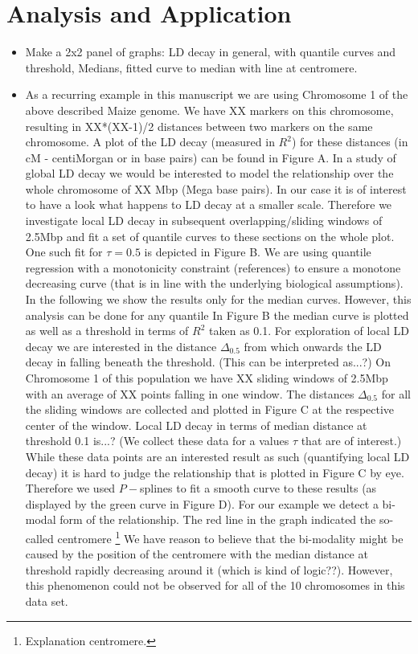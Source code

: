 \documentclass[twoside]{report}
\begin{document}
\section{Analysis and Application}
\begin{itemize}
\item Make a 2x2 panel of graphs: LD decay in general, with quantile curves and threshold, 
	Medians, fitted curve to median with line at centromere.
\item As a recurring example in this manuscript we are using Chromosome 1 of the above described 
	Maize genome. We have XX markers on this chromosome, resulting in XX*(XX-1)/2 distances 
	between two markers on the same chromosome. A plot of the LD decay (measured in $R^2$) 
	for these distances (in cM - centiMorgan or in base pairs) can be found in Figure A. 
	In a study of global 
	LD decay we would be interested to model the relationship over the whole chromosome of 
	XX Mbp (Mega base pairs). In our case it is of interest to have a look what happens to 
	LD decay at a smaller scale. Therefore we investigate local LD decay in subsequent 
	overlapping/sliding windows of 2.5Mbp and fit a set of quantile curves to these 
	sections on the whole plot. One such fit for $\tau = 0.5$ is depicted in Figure B. 
	We are using quantile 
	regression with a monotonicity constraint (references) 
	to ensure a monotone decreasing curve (that is 
	in line with the underlying biological assumptions). In the following we show the 
	results only for the median curves. However, this analysis can be done for any quantile  
	In Figure B the median curve is plotted as well as a threshold in terms of $R^2$ taken as 
	0.1. For exploration of local LD decay we are interested in the distance $\Delta_{0.5}$ from 
	which onwards the LD decay in falling beneath the threshold. (This can be interpreted as...?)
	On Chromosome 1 of this population we have XX sliding windows of 2.5Mbp with an 
	average of XX points falling in one window. The distances 
	$\Delta_{0.5}$ for all the sliding windows are collected and plotted in Figure C 
	at the respective center of the window. Local 
	LD decay in terms of median distance at threshold 0.1 is...? (We collect these data for a 
	values $\tau$ that are of interest.) While these data points are an interested result as
	such (quantifying local LD decay) it is hard to judge the relationship that is plotted in 
	Figure C by eye. Therefore we used $P-$splines to fit a smooth curve to these results (as 
	displayed by the green curve in Figure D). For our example we detect a bi-modal form of the 
	relationship. The red line in the graph indicated the so-called centromere \footnote{
	Explanation centromere.} We have reason to believe that the bi-modality might be caused by 
	the position of the centromere with the median distance at threshold rapidly decreasing 
	around it (which is kind of logic??). However, this phenomenon could not be observed for 
	all of the 10 chromosomes in this data set.   
\end{itemize}
\end{document}
